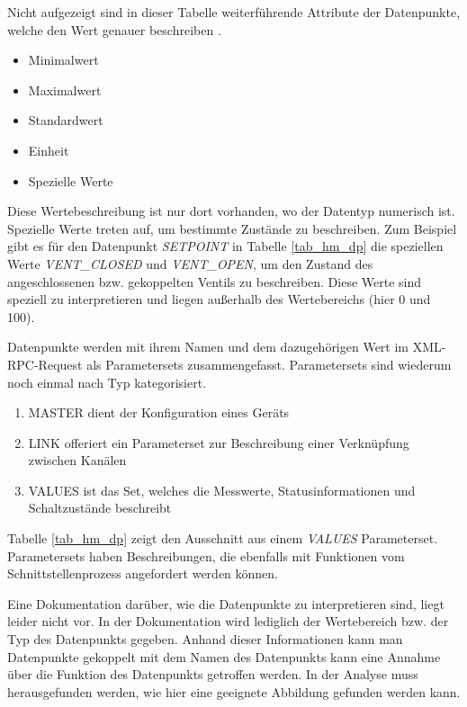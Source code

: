 Nicht aufgezeigt sind in dieser Tabelle weiterführende Attribute der Datenpunkte, welche
den Wert genauer beschreiben \cite[Seite 3]{hmscript4}.

\begin{itemize}
\item Minimalwert
\item Maximalwert
\item Standardwert
\item Einheit
\item Spezielle Werte
\end{itemize}

Diese Wertebeschreibung ist nur dort vorhanden, wo der Datentyp numerisch ist.
Spezielle Werte treten auf, um bestimmte Zustände zu beschreiben.
Zum Beispiel gibt es für den Datenpunkt \emph{SETPOINT} in Tabelle \ref{tab_hm_dp}
die speziellen Werte \emph{VENT\_CLOSED} und \emph{VENT\_OPEN}, um den Zustand des angeschlossenen
bzw. gekoppelten Ventils zu beschreiben.
Diese Werte sind speziell zu interpretieren und liegen außerhalb des Wertebereichs
(hier 0 und 100).

Datenpunkte werden mit ihrem Namen und dem dazugehörigen Wert im XML-RPC-Request als Parametersets
zusammengefasst.
Parametersets sind wiederum noch einmal nach Typ kategorisiert.
\begin{enumerate}
\item MASTER dient der Konfiguration eines Geräts
\item LINK offeriert ein Parameterset zur Beschreibung einer Verknüpfung zwischen Kanälen
\item VALUES ist das Set, welches die Messwerte, Statusinformationen und Schaltzustände beschreibt
\end{enumerate}
Tabelle \ref{tab_hm_dp} zeigt den Ausschnitt aus einem \emph{VALUES} Parameterset.
Parametersets haben Beschreibungen, die ebenfalls mit Funktionen vom Schnittstellenprozess
angefordert werden können.

Eine Dokumentation darüber, wie die Datenpunkte zu interpretieren sind, liegt leider nicht vor.
In der Dokumentation wird lediglich der Wertebereich bzw. der Typ des Datenpunkts gegeben.
Anhand dieser Informationen kann man Datenpunkte gekoppelt mit dem Namen des Datenpunkts
kann eine Annahme über die Funktion des Datenpunkts getroffen werden.
In der Analyse muss herausgefunden werden, wie hier eine geeignete Abbildung gefunden werden kann.
